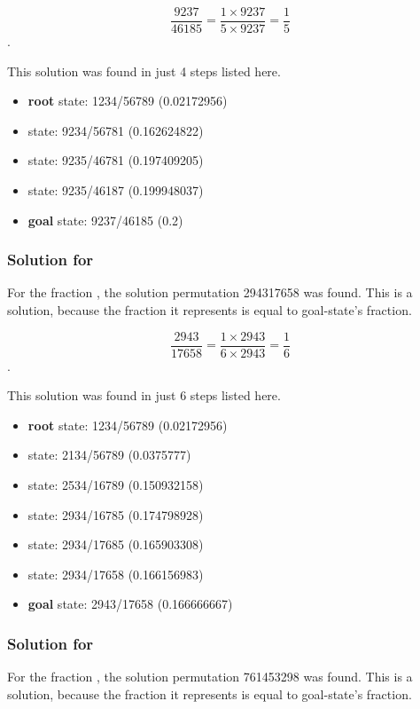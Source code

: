 \documentclass{article}
\begin{document}
\[\frac{9237}{46185} = \frac{1 \times 9237}{5 \times 9237}
= \frac{1}{5}\].

This solution was found in just 4 steps listed here.

\begin{itemize}
  \item \textbf{root} state: 1234/56789 (0.02172956) 
  \item state: 9234/56781 (0.162624822)
  \item state: 9235/46781 (0.197409205)
  \item state: 9235/46187 (0.199948037)
  \item \textbf{goal} state: 9237/46185 (0.2)
\end{itemize}

\subsubsection{Solution for }

For the fraction , the solution permutation 294317658 was
found. This is a solution, because the fraction it represents is equal to
goal-state's fraction.

\[\frac{2943}{17658} = \frac{1 \times 2943}{6 \times 2943}
= \frac{1}{6}\].

This solution was found in just 6 steps listed here.

\begin{itemize}
  \item \textbf{root} state: 1234/56789 (0.02172956) 
  \item state: 2134/56789 (0.0375777)
  \item state: 2534/16789 (0.150932158)
  \item state: 2934/16785 (0.174798928)
  \item state: 2934/17685 (0.165903308)
  \item state: 2934/17658 (0.166156983)
  \item \textbf{goal} state: 2943/17658 (0.166666667)
\end{itemize}

\subsubsection{Solution for }

For the fraction , the solution permutation 761453298 was
found. This is a solution, because the fraction it represents is equal to
goal-state's fraction.
\end{document}

